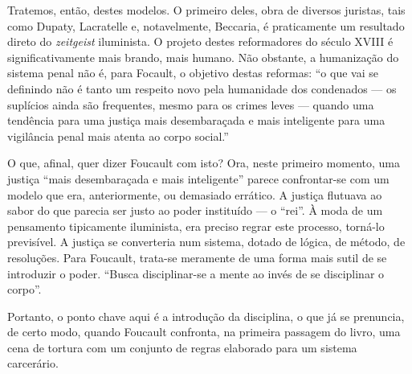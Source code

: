 \documentclass[12pt,a4paper]{article}
\begin{document}
	Tratemos, então, destes modelos. O primeiro deles, obra de diversos 
	juristas, tais como Dupaty, Lacratelle e, notavelmente, Beccaria, 
	é praticamente um resultado direto do \textit{zeitgeist} iluminista. 
	O projeto destes reformadores do século XVIII é significativamente 
	mais brando, mais humano. Não obstante, a humanização do sistema 
	penal não é, para Focault, o objetivo destas reformas:  
	``o que vai se definindo não é tanto um respeito novo pela humanidade 
	dos condenados --- os suplícios ainda são frequentes, mesmo para os 
	crimes leves --- quando uma tendência para uma justiça mais 
	desembaraçada e mais inteligente para uma vigilância penal mais atenta 
	ao corpo social.'' %

	O que, afinal, quer dizer Foucault com isto? Ora, neste primeiro 
	momento, uma justiça ``mais desembaraçada e mais inteligente'' parece 
	confrontar-se com um modelo que era, anteriormente, ou demasiado 
	errático. A justiça flutuava ao sabor do que parecia ser justo ao 
	poder instituído --- o ``rei''. À moda de um pensamento tipicamente 
	iluminista, era preciso regrar este processo, torná-lo previsível. 
	A justiça se converteria num sistema, dotado de lógica, de método, 
	de resoluções. Para Foucault, trata-se meramente de uma forma mais 
	sutil de se introduzir o poder. ``Busca disciplinar-se a mente ao 
	invés de se disciplinar o corpo''. 

	Portanto, o ponto chave aqui é a introdução da disciplina, o que já 
	se prenuncia, de certo modo, quando Foucault confronta, na primeira 
	passagem do livro, uma cena de tortura com um conjunto de regras 
	elaborado para um sistema carcerário. 







\end{document}
